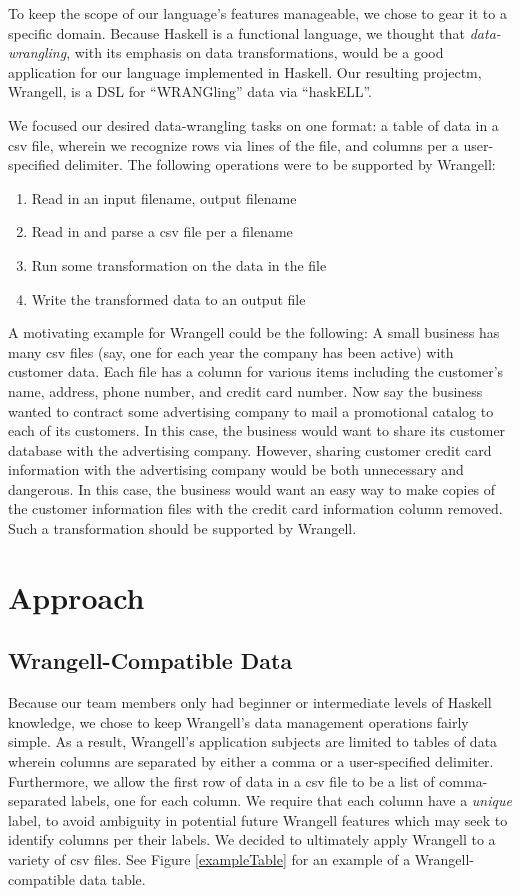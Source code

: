 \documentclass[preprint,nocopyrightspace]{sig-alternate}
\begin{document}
To keep the scope of our language's features manageable, we chose to gear it to a specific domain. Because Haskell is a functional language, we thought that \emph{data-wrangling}, with its emphasis on data transformations, would be a good application for our language implemented in Haskell. Our resulting projectm, Wrangell, is a DSL for ``WRANGling'' data via ``haskELL''.  

We focused our desired data-wrangling tasks on one format: a table of data in a csv file, wherein we recognize rows via lines of the file, and columns per a user-specified delimiter. The following operations were to be supported by Wrangell:

\begin{enumerate}
\item Read in an input filename, output filename
\item Read in and parse a csv file per a filename 
\item Run some transformation on the data in the file
\item Write the transformed data to an output file
\end{enumerate}

A motivating example for Wrangell could be the following: A small business has many csv files (say, one for each year the company has been active) with customer data. Each file has a column for various items including the customer's name, address, phone number, and credit card number. Now say the business wanted to contract some advertising company to mail a promotional catalog to each of its customers. In this case, the business would want to share its customer database with the advertising company. However, sharing customer credit card information with the advertising company would be both unnecessary and dangerous. In this case,  the business would want an easy way to make copies of the customer information files with the credit card information column removed. Such a transformation should be supported by Wrangell.    


\section{Approach}

\subsection{Wrangell-Compatible Data}
Because our team members only had beginner or intermediate levels of Haskell knowledge, we chose to keep Wrangell's data management operations fairly simple. 
As a result, Wrangell's application subjects are limited to tables of data wherein columns are separated by either a comma or a user-specified delimiter. Furthermore, we allow the first row of data in a csv file to be a list of comma-separated labels, one for each column. We require that each column have a \emph{unique} label, to avoid ambiguity in potential future Wrangell features which may seek to identify columns per their labels. We decided to ultimately apply Wrangell to a variety of csv files. See Figure \ref{exampleTable} for an example of a Wrangell-compatible data table. 
\end{document}
